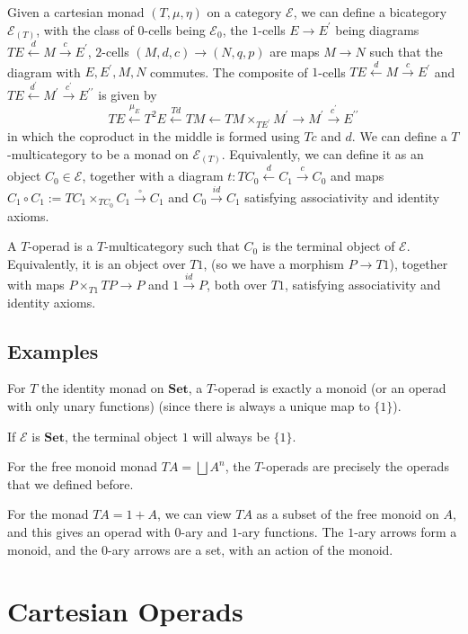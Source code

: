 \documentclass{amsbook}
\newcommand{\Catb}[1]{\mathbf{#1}}
\newcommand{\SET}{\Catb{Set}}
\begin{document}
  Given a cartesian monad $ (T, \mu, \eta) $ on a category $ \mathcal E $, we can define a bicategory $ \mathcal E_{(T)} $, with the class of $ 0 $-cells being $ \mathcal E_0 $, the $ 1 $-cells $ E \to E^\prime $ being diagrams $ TE \xleftarrow{d} M \xrightarrow{c} E^\prime $, $ 2 $-cells $ (M, d, c) \to (N, q, p) $ are maps $ M \to N $ such that the diagram with $ E, E^\prime, M, N $ commutes. The composite of $ 1 $-cells $ TE \xleftarrow{d} M \xrightarrow{c} E^\prime $ and $ TE \xleftarrow{d^\prime} M^\prime \xrightarrow{c^\prime} E^{\prime\prime} $ is given by
  \[ T E \xleftarrow{\mu_E} T^2 E \xleftarrow{T d} TM \xleftarrow{} T M \times_{T E^\prime} M^\prime \xrightarrow{} M^\prime \xrightarrow{c^\prime} E^{\prime\prime} \]
  in which the coproduct in the middle is formed using $ T c $ and $ d $.
  We can define a $ T $-multicategory to be a monad on $ \mathcal E_{(T)} $. Equivalently, we can define it as an object $ C_0 \in \mathcal E $, together with a diagram $ t: T C_0 \xleftarrow{d} C_1 \xrightarrow{c} C_0 $ and maps $ C_1 \circ C_1 := T C_1 \times_{T C_0} C_1 \xrightarrow{\circ} C_1 $ and $ C_0 \xrightarrow{id} C_1 $ satisfying associativity and identity axioms.

  A $ T $-operad is a $ T $-multicategory such that $ C_0 $ is the terminal object of $ \mathcal E $. Equivalently, it is an object over $ T 1 $, (so we have a morphism $ P \to T 1 $), together with maps $ P \times_{T 1} T P \to P $ and $ 1 \xrightarrow{id} P $, both over $ T 1 $, satisfying associativity and identity axioms.

  \subsection{Examples}
  For $ T $ the identity monad on $ \SET $, a $ T $-operad is exactly a monoid (or an operad with only unary functions) (since there is always a unique map to $ \{ 1 \} $).

  If $ \mathcal E $ is $ \SET $, the terminal object $ 1 $ will always be $ \{ 1 \} $.

  For the free monoid monad $ T A = \bigsqcup A^n $, the $ T $-operads are precisely the operads that we defined before.

  For the monad $ T A = 1 + A $, we can view $ T A $ as a subset of the free monoid on $ A $, and this gives an operad with $ 0 $-ary and $ 1 $-ary functions. The $ 1 $-ary arrows form a monoid, and the $ 0 $-ary arrows are a set, with an action of the monoid.

  \section{Cartesian Operads}
\end{document}
